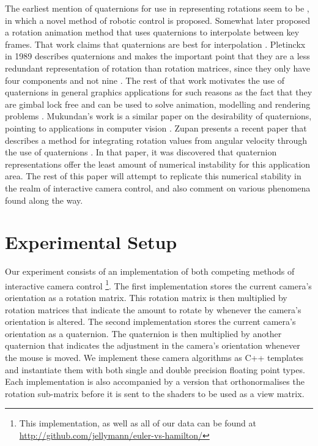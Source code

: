 \documentclass{acm_proc_article-sp}
\begin{document}
The earliest mention of quaternions for use in representing rotations seem to be \cite{taylor79}, in which a novel method of robotic control is proposed.
Somewhat later \cite{schoemake85} proposed a rotation animation method that uses quaternions to interpolate between key frames.
That work claims that quaternions are best for interpolation \cite{schoemake85}.
Pletinckx in 1989 describes quaternions and makes the important point that they are a less redundant representation of rotation than rotation matrices, since they only have four components and not nine \cite{pletinckx89}.
The rest of that work motivates the use of quaternions in general graphics applications for such reasons as the fact that they are gimbal lock free \cite{pletinckx89} and can be used to solve animation, modelling and rendering problems \cite{pletinckx89}.
Mukundan's work is a similar paper on the desirability of quaternions, pointing to applications in computer vision \cite{mukundan02}.
Zupan presents a recent paper that describes a method for integrating rotation values from angular velocity through the use of quaternions \cite{zupan11}.
In that paper, it was discovered that quaternion representations offer the least amount of numerical instability for this application area.
The rest of this paper will attempt to replicate this numerical stability in the realm of interactive camera control, and also comment on various phenomena found along the way.

\section{Experimental Setup}

Our experiment consists of an implementation of both competing methods of interactive camera control \footnote{This implementation, as well as all of our data can be found at \url{http://github.com/jellymann/euler-vs-hamilton/}}.
The first implementation stores the current camera's orientation as a rotation matrix.
This rotation matrix is then multiplied by rotation matrices that indicate the amount to rotate by whenever the camera's orientation is altered.
The second implementation stores the current camera's orientation as a quaternion.
The quaternion is then multiplied by another quaternion that indicates the adjustment in the camera's orientation whenever the mouse is moved.
We implement these camera algorithms as C++ templates and instantiate them with both single and double precision floating point types.
Each implementation is also accompanied by a version that orthonormalises the rotation sub-matrix before it is sent to the shaders to be used as a view matrix.
\end{document}
